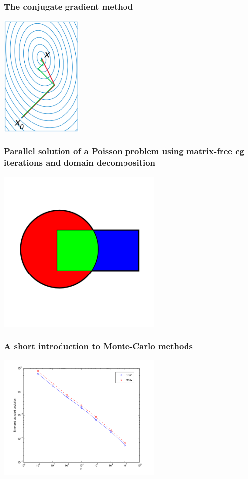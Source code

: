 \documentclass{beamer}
\begin{document}
\begin{frame}\frametitle{The conjugate gradient method}
  \begin{center}
    \includegraphics[width=4cm]{cg}
  \end{center}
\end{frame}

\begin{frame}\frametitle{Parallel solution of a Poisson problem using
                         matrix-free cg iterations and domain decomposition}
  \begin{center}
    \includegraphics[width=8cm]{dd}
  \end{center}
\end{frame}

\begin{frame}\frametitle{A short introduction to Monte-Carlo methods}
  \begin{center}
    \includegraphics[width=8cm]{Convergence_error_stdev}
  \end{center}
\end{frame}
\end{document}
